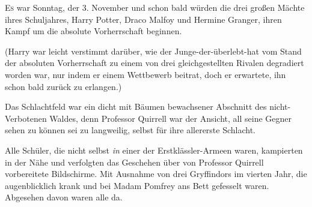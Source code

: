 

\lettrine{E}{s} war Sonntag, der 3. November und schon bald würden die drei großen Mächte ihres Schuljahres, Harry Potter, Draco Malfoy und Hermine Granger, ihren Kampf um die absolute Vorherrschaft beginnen.

(Harry war leicht verstimmt darüber, wie der Junge-der-überlebt-hat vom Stand der absoluten Vorherrschaft zu einem von drei gleichgestellten Rivalen degradiert worden war, nur indem er einem Wettbewerb beitrat, doch er erwartete, ihn schon bald zurück zu erlangen.)

Das Schlachtfeld war ein dicht mit Bäumen bewachsener Abschnitt des nicht-Verbotenen Waldes, denn Professor Quirrell war der Ansicht, all seine Gegner sehen zu können sei zu langweilig, selbst für ihre allererste Schlacht.

Alle Schüler, die nicht selbst \emph{in} einer der Erstklässler-Armeen waren, kampierten in der Nähe und verfolgten das Geschehen über von Professor Quirrell vorbereitete Bildschirme. Mit Ausnahme von drei Gryffindors im vierten Jahr, die augenblicklich krank und bei Madam Pomfrey ans Bett gefesselt waren. Abgesehen davon waren alle da.

